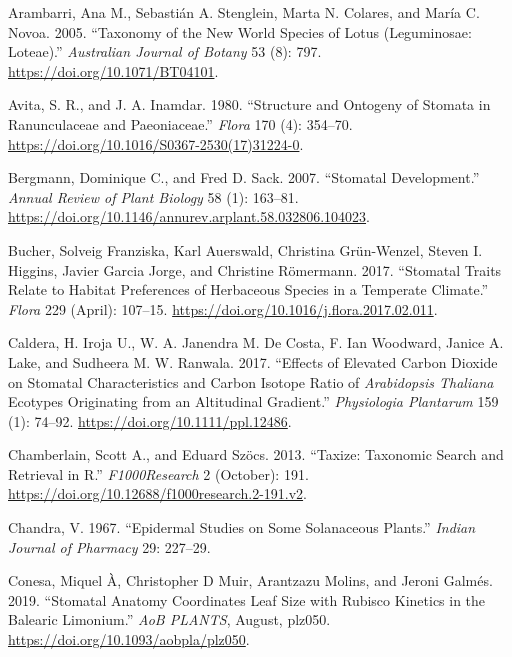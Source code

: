 \documentclass[
  12pt,
]{article}
\newlength{\cslhangindent}
\newlength{\cslentryspacingunit} %
\newenvironment{CSLReferences}[2] %
 {%
  \setlength{\parindent}{0pt}
  \ifodd #1
  \let\oldpar\par
  \def\par{\hangindent=\cslhangindent\oldpar}
  \fi
  \setlength{\parskip}{#2\cslentryspacingunit}
 }%
 {}
\begin{document}
\hypertarget{refs}{}
\begin{CSLReferences}{1}{0}
\leavevmode{}%
Arambarri, Ana M., Sebastián A. Stenglein, Marta N. Colares, and María C. Novoa. 2005. {``Taxonomy of the {New} {World} Species of {Lotus} ({Leguminosae}: {Loteae}).''} \emph{Australian Journal of Botany} 53 (8): 797. \url{https://doi.org/10.1071/BT04101}.

\leavevmode{}%
Avita, S. R., and J. A. Inamdar. 1980. {``Structure and {Ontogeny} of {Stomata} in {Ranunculaceae} and {Paeoniaceae}.''} \emph{Flora} 170 (4): 354--70. \url{https://doi.org/10.1016/S0367-2530(17)31224-0}.

\leavevmode{}%
Bergmann, Dominique C., and Fred D. Sack. 2007. {``Stomatal {Development}.''} \emph{Annual Review of Plant Biology} 58 (1): 163--81. \url{https://doi.org/10.1146/annurev.arplant.58.032806.104023}.

\leavevmode{}%
Bucher, Solveig Franziska, Karl Auerswald, Christina Grün-Wenzel, Steven I. Higgins, Javier Garcia Jorge, and Christine Römermann. 2017. {``Stomatal Traits Relate to Habitat Preferences of Herbaceous Species in a Temperate Climate.''} \emph{Flora} 229 (April): 107--15. \url{https://doi.org/10.1016/j.flora.2017.02.011}.

\leavevmode{}%
Caldera, H. Iroja U., W. A. Janendra M. De Costa, F. Ian Woodward, Janice A. Lake, and Sudheera M. W. Ranwala. 2017. {``Effects of Elevated Carbon Dioxide on Stomatal Characteristics and Carbon Isotope Ratio of \emph{{Arabidopsis} Thaliana} Ecotypes Originating from an Altitudinal Gradient.''} \emph{Physiologia Plantarum} 159 (1): 74--92. \url{https://doi.org/10.1111/ppl.12486}.

\leavevmode{}%
Chamberlain, Scott A., and Eduard Szöcs. 2013. {``Taxize: Taxonomic Search and Retrieval in {R}.''} \emph{F1000Research} 2 (October): 191. \url{https://doi.org/10.12688/f1000research.2-191.v2}.

\leavevmode{}%
Chandra, V. 1967. {``Epidermal Studies on Some {Solanaceous} Plants.''} \emph{Indian Journal of Pharmacy} 29: 227--29.

\leavevmode{}%
Conesa, Miquel À, Christopher D Muir, Arantzazu Molins, and Jeroni Galmés. 2019. {``Stomatal Anatomy Coordinates Leaf Size with {Rubisco} Kinetics in the {Balearic} {Limonium}.''} \emph{AoB PLANTS}, August, plz050. \url{https://doi.org/10.1093/aobpla/plz050}.


\end{CSLReferences}
\end{document}
